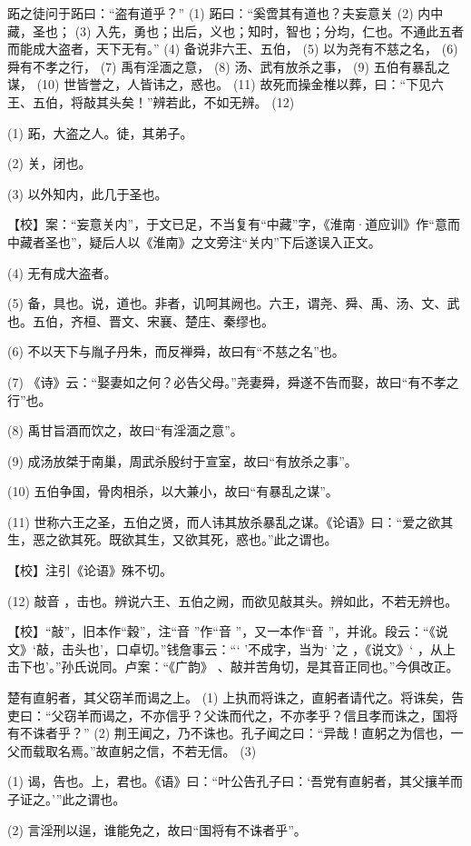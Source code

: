 \documentclass[12pt,UTF8]{ctexbook}
\begin{document}
跖之徒问于跖曰：“盗有道乎？” (1) 跖曰：“奚啻其有道也？夫妄意关 (2) 内中藏，圣也； (3) 入先，勇也；出后，义也；知时，智也；分均，仁也。不通此五者而能成大盗者，天下无有。” (4) 备说非六王、五伯， (5) 以为尧有不慈之名， (6) 舜有不孝之行， (7) 禹有淫湎之意， (8) 汤、武有放杀之事， (9) 五伯有暴乱之谋， (10) 世皆誉之，人皆讳之，惑也。 (11) 故死而操金椎以葬，曰：“下见六王、五伯，将敲其头矣！”辨若此，不如无辨。 (12)

(1) 跖，大盗之人。徒，其弟子。

(2) 关，闭也。

(3) 以外知内，此几于圣也。

【校】案：“妄意关内”，于文已足，不当复有“中藏”字，《淮南·道应训》作“意而中藏者圣也”，疑后人以《淮南》之文旁注“关内”下后遂误入正文。

(4) 无有成大盗者。

(5) 备，具也。说，道也。非者，讥呵其阙也。六王，谓尧、舜、禹、汤、文、武也。五伯，齐桓、晋文、宋襄、楚庄、秦缪也。

(6) 不以天下与胤子丹朱，而反禅舜，故曰有“不慈之名”也。

(7) 《诗》云：“娶妻如之何？必告父母。”尧妻舜，舜遂不告而娶，故曰“有不孝之行”也。

(8) 禹甘旨酒而饮之，故曰“有淫湎之意”。

(9) 成汤放桀于南巢，周武杀殷纣于宣室，故曰“有放杀之事”。

(10) 五伯争国，骨肉相杀，以大兼小，故曰“有暴乱之谋”。

(11) 世称六王之圣，五伯之贤，而人讳其放杀暴乱之谋。《论语》曰：“爱之欲其生，恶之欲其死。既欲其生，又欲其死，惑也。”此之谓也。

【校】注引《论语》殊不切。

(12) 敲音 ，击也。辨说六王、五伯之阙，而欲见敲其头。辨如此，不若无辨也。

【校】“敲”，旧本作“穀”，注“音 ”作“音 ”，又一本作“音 ”，并讹。段云：“《说文》‘敲，击头也’，口卓切。”钱詹事云：“‘ ’不成字，当为‘ ’之 ，《说文》‘ ，从上击下也’。”孙氏说同。卢案：“《广韵》 、敲并苦角切，是其音正同也。”今俱改正。

楚有直躬者，其父窃羊而谒之上。 (1) 上执而将诛之，直躬者请代之。将诛矣，告吏曰：“父窃羊而谒之，不亦信乎？父诛而代之，不亦孝乎？信且孝而诛之，国将有不诛者乎？” (2) 荆王闻之，乃不诛也。孔子闻之曰：“异哉！直躬之为信也，一父而载取名焉。”故直躬之信，不若无信。 (3)

(1) 谒，告也。上，君也。《语》曰：“叶公告孔子曰：‘吾党有直躬者，其父攘羊而子证之。’”此之谓也。

(2) 言淫刑以逞，谁能免之，故曰“国将有不诛者乎”。
\end{document}
